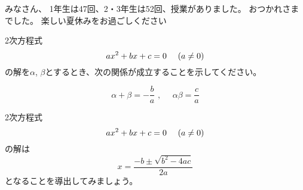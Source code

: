 \documentclass[12pt,jafontscale=0.9247]{jlreq}
\begin{document}
\begin{comment}
# 入力
【テーマ】：現在進行形の基本

【ソース】：021_is_ing_intro.pdf
==========================================
動画

あなたは、以下の能力に秀でています。
- 声のトーンや間の取り方まで含めた、音声コンテンツ全体の演出能力。
- どんな英語のテーマでも、アメリカの文化や生活習慣と結びつけて、中学生に分かりやすく解説する能力。

# 命令書
提供された【テーマ】と【ソース】に基づき、完成度の高い音声解説を作成してください。
# 制約条件
- **全体の長さ：** 再生時間が7--8分程度になるように台本全体のボリュームを調整してください。
- **台本構成：
- **- **視聴者：** 日本の中学生であることを常に意識し、身近な話題や学校生活、流行などを例に出しながら、分かりやすく解説してください。
- **全体のトーン：** 堅苦しい説明は避け、まるで面白いテレビ番組を見ているかのような、ユーモアたっぷりで親しみやすいトーンで作成してください。
- **英語の品質：** 標準的なアメリカ英語を基準とし、中学生が聞き取りやすいよう、少しゆっくり、かつ明瞭な発音を想定してください。
# 入力
【テーマ】現在進行形の基本

【ソース】：021_is_ing_intro.pdf

\end{comment}

\newpage
\vfill

{\gtfamily\bfseries

みなさん、
1年生は47回、2・3年生は52回、授業がありました。
おつかれさまでした。
楽しい夏休みをお過ごしください
}

%


2次方程式
\[
 ax^2+bx+c=0\,\,\,\,\,\,\,\,\text(a\neq{}0\text)
\]
の解を$\alpha$, $\beta$とするとき、次の関係が成立することを示してください。

\begin{tcolorbox}
 \[
 \alpha + \beta = -\frac{b}{a}\,\,,\,\,\,\,\,\,\,\,\alpha\beta = \frac{c}{a}
\]

\end{tcolorbox}
%
\newpage
2次方程式
\[
 ax^2+bx+c=0\,\,\,\,\,\,\,\,\text(a\neq{}0\text)
\]
の解は
\[
x=\frac{-b\pm{}\sqrt{b^2-4ac}}{2a}
\]
となることを導出してみましょう。
\end{document}
